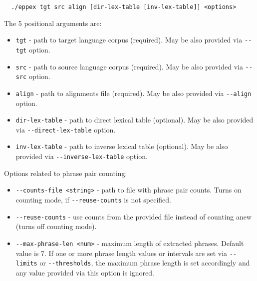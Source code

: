 \begin{verbatim}
  ./eppex tgt src align [dir-lex-table [inv-lex-table]] <options>
\end{verbatim}

The 5 positional arguments are:
\begin{itemize}
 \item \verb|tgt| - path to target language corpus (required).
  May be also provided via \verb|--tgt| option.
 \item \verb|src| - path to source language corpus (required).
  May be also provided via \verb|--src| option.
 \item \verb|align| - path to alignments file (required).
  May be also provided via \verb|--align| option.
 \item \verb|dir-lex-table| - path to direct lexical table (optional).
  May be also provided via \verb|--direct-lex-table| option. 
 \item \verb|inv-lex-table| - path to inverse lexical table (optional).
  May be also provided via \verb|--inverse-lex-table| option. 
\end{itemize}

Options related to phrase pair counting:
\begin{itemize}
 \item \verb|--counts-file <string>| - path to file with phrase pair counts.
  Turns on counting mode, if \verb|--reuse-counts| is not specified.
 \item \verb|--reuse-counts| - use counts from the provided file instead
  of counting anew (turns off counting mode).
 \item \verb|--max-phrase-len <num>| - maximum length of extracted phrases.
  Default value is 7. If one or more phrase length values or intervals
  are set via \verb|--limits| or \verb|--thresholds|, the maximum phrase
  length is set accordingly and any value provided via this option is ignored.
\end{itemize}

